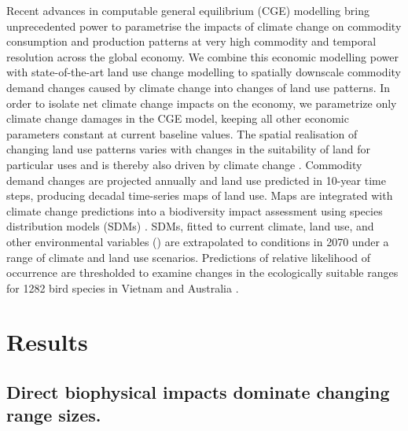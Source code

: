 Recent advances in computable general equilibrium (CGE) modelling \citep{van_ha_building_2017, van_ha_solving_2016} bring unprecedented power to parametrise the impacts of climate change on commodity consumption and production patterns at very high commodity and temporal resolution across the global economy. We combine this economic modelling power with state-of-the-art land use change modelling to spatially downscale commodity demand changes caused by climate change \citep{roson_estimation_2016} into changes of land use patterns. In order to isolate net climate change impacts on the economy, we parametrize only climate change damages in the CGE model, keeping all other economic parameters constant at current baseline values. The spatial realisation of changing land use patterns varies with changes in the suitability of land for particular uses and is thereby also driven by climate change \citep{verburg_combining_2009, fuchs_high-resolution_2013}. Commodity demand changes are projected annually and land use predicted in 10-year time steps, producing decadal time-series maps of land use. Maps are integrated with climate change predictions into a biodiversity impact assessment using species distribution models (SDMs) \citep{lawson_prevalence_2014, wintle_fauna_2005, wintle_ecologicaleconomic_2011, thomas_climate_2004}. SDMs, fitted to current climate, land use, and other environmental variables () are extrapolated to conditions in 2070 under a range of climate and land use scenarios. Predictions of relative likelihood of occurrence are thresholded to examine changes in the ecologically suitable ranges for 1282 bird species in Vietnam and Australia \citep{lawson_prevalence_2014, wintle_fauna_2005, wintle_ecologicaleconomic_2011, thomas_climate_2004}.

\section{Results}
\subsection{Direct biophysical impacts dominate changing range sizes.}

